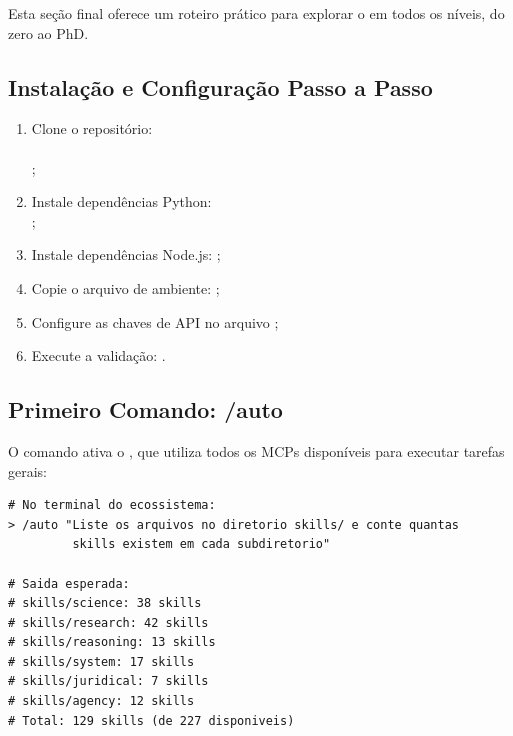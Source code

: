 Esta seção final oferece um roteiro prático para explorar o
\opencodeeco{} em todos os níveis, do zero ao PhD.

\subsection{Instalação e Configuração Passo a Passo}
\label{subsec:lab-instalacao}

\begin{enumerate}
\item Clone o repositório: \\\hspace*{2em} \\%
\hspace*{4em};
\item Instale dependências Python: \\\hspace*{2em};
\item Instale dependências Node.js: ;
\item Copie o arquivo de ambiente: ;
\item Configure as chaves de API no arquivo ;
\item Execute a validação: .
\end{enumerate}

\subsection{Primeiro Comando: /auto}
\label{subsec:lab-auto}

O comando  ativa o , que utiliza todos
os MCPs disponíveis para executar tarefas gerais:

\begin{lstlisting}[style=bashstyle, caption={Executando o comando /auto},
                   label={lst:lab-auto}]
# No terminal do ecossistema:
> /auto "Liste os arquivos no diretorio skills/ e conte quantas
         skills existem em cada subdiretorio"

# Saida esperada:
# skills/science: 38 skills
# skills/research: 42 skills
# skills/reasoning: 13 skills
# skills/system: 17 skills
# skills/juridical: 7 skills
# skills/agency: 12 skills
# Total: 129 skills (de 227 disponiveis)
\end{lstlisting}

